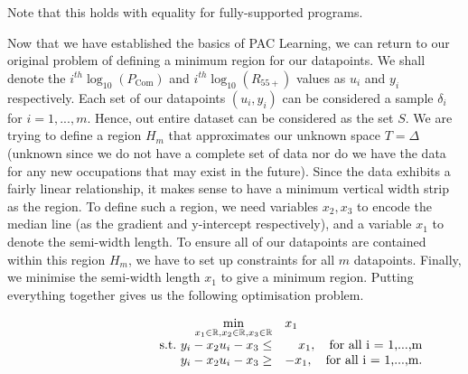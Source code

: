 \documentclass[11pt]{article}
\begin{document}
Note that this holds with equality for fully-supported programs.

Now that we have established the basics of PAC Learning, we can return to our original problem of defining a minimum region for our datapoints. We shall denote the $i^{th} \log_{10}(P_{\text{Com}})$ and $i^{th} \log_{10}(R_{55+})$ values as $u_{i}$ and $y_{i}$ respectively. Each set of our datapoints $(u_{i}, y_{i})$ can be considered a sample $\delta_{i}$ for $i=1,...,m$. Hence, out entire dataset can be considered as the set $S$.  We are trying to define a region $H_{m}$ that approximates our unknown space $T=\Delta$ (unknown since we do not have a complete set of data nor do we have the data for any new occupations that may exist in the future). Since the data exhibits a fairly linear relationship, it makes sense to have a minimum vertical width strip as the region. To define such a region, we need variables $x_{2}, x_{3}$ to encode the median line (as the gradient and y-intercept respectively), and a variable $x_{1}$ to denote the semi-width length. To ensure all of our datapoints are contained within this region $H_{m}$, we have to set up constraints for all $m$ datapoints. Finally, we minimise the semi-width length $x_{1}$ to give a minimum region. Putting everything together gives us the following optimisation problem.

\begin{align}
	\label{eq:5}
	\begin{array}{rrclcl}
	\displaystyle \min_{x_{1} \in \mathbb{R},x_{2} \in \mathbb{R},x_{3} \in \mathbb{R}}&  \multicolumn{3}{l}{x_{1}}&\\
	\text{s.t.}\  y_{i} - x_{2}u_{i} - x_{3} \leq& x_{1}, \quad \text{for all i = 1,...,m}&\\
	y_{i} - x_{2}u_{i} - x_{3} \geq& -x_{1}, \quad \text{for all i = 1,...,m}.&\\
	\end{array}
\end{align}


\end{document}
